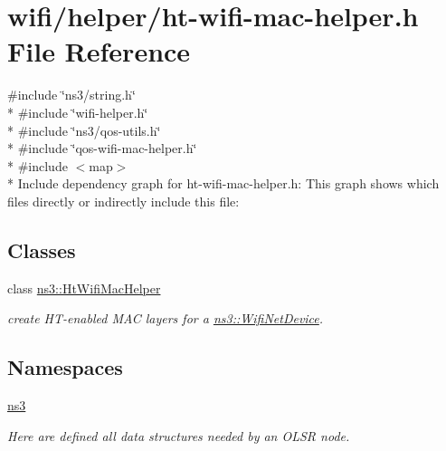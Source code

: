 \hypertarget{ht-wifi-mac-helper_8h}{}\section{wifi/helper/ht-\/wifi-\/mac-\/helper.h File Reference}
\label{ht-wifi-mac-helper_8h}
{\ttfamily \#include \char`\"{}ns3/string.\+h\char`\"{}}\\*
{\ttfamily \#include \char`\"{}wifi-\/helper.\+h\char`\"{}}\\*
{\ttfamily \#include \char`\"{}ns3/qos-\/utils.\+h\char`\"{}}\\*
{\ttfamily \#include \char`\"{}qos-\/wifi-\/mac-\/helper.\+h\char`\"{}}\\*
{\ttfamily \#include $<$map$>$}\\*
Include dependency graph for ht-\/wifi-\/mac-\/helper.h\+:
This graph shows which files directly or indirectly include this file\+:
\subsection*{Classes}
\begin{DoxyCompactItemize}
\item 
class \hyperlink{classns3_1_1HtWifiMacHelper}{ns3\+::\+Ht\+Wifi\+Mac\+Helper}
\begin{DoxyCompactList}\small\item\em create H\+T-\/enabled M\+AC layers for a \hyperlink{classns3_1_1WifiNetDevice}{ns3\+::\+Wifi\+Net\+Device}. \end{DoxyCompactList}\end{DoxyCompactItemize}
\subsection*{Namespaces}
\begin{DoxyCompactItemize}
\item 
 \hyperlink{namespacens3}{ns3}
\begin{DoxyCompactList}\small\item\em Here are defined all data structures needed by an O\+L\+SR node. \end{DoxyCompactList}\end{DoxyCompactItemize}
